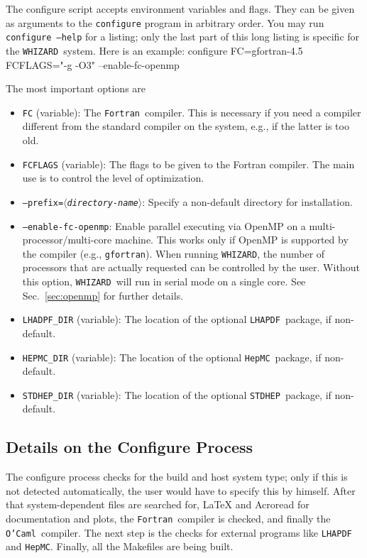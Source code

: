 \documentclass[12pt]{book}
\newenvironment{interaction}%
  {\begingroup\small
   \verbatim}%
  {\endverbatim
   \endgroup\noindent}
\newcommand{\var}[1]{$\langle$\textit{#1}$\rangle$}
\newcommand{\ttt}[1]{\texttt{#1}}
\newcommand{\whizard}{\texttt{WHIZARD}}
\newcommand{\stdhep}{\texttt{STDHEP}}
\newcommand{\lhapdf}{\texttt{LHAPDF}}
\newcommand{\hepmc}{\texttt{HepMC}}
\newcommand{\fortran}{\texttt{Fortran}}
\newcommand{\ocaml}{\texttt{O'Caml}}
\begin{document}
The configure script accepts environment variables and flags.  They
can be given as arguments to the \ttt{configure} program in arbitrary
order.  You may run \ttt{configure --help} for a listing; only the
last part of this long listing is specific for the \whizard\ system.
Here is an example:
\begin{interaction}
  configure  FC=gfortran-4.5  FCFLAGS="-g -O3"  --enable-fc-openmp
\end{interaction}

The most important options are
\begin{itemize}
\item
  \ttt{FC} (variable): The \fortran\ compiler.  This is necessary if
  you need a compiler different from the standard compiler on the
  system, e.g., if the latter is too old.
\item
  \ttt{FCFLAGS} (variable): The flags to be given to the Fortran
  compiler.  The main use is to control the level of optimization.
\item
  \ttt{--prefix=\var{directory-name}}: Specify a non-default directory
  for installation.
\item
  \ttt{--enable-fc-openmp}: Enable parallel executing via OpenMP on a
  multi-processor/multi-core machine.  This works only if OpenMP is
  supported by the compiler (e.g., \ttt{gfortran}).  When running
  \whizard, the number of processors that are actually requested can
  be controlled by the user.  Without this option, \whizard\ will run
  in serial mode on a single core.  See Sec.~\ref{sec:openmp} for
  further details.
\item
  \ttt{LHADPF\_DIR} (variable): The location of the optional \lhapdf\
  package, if non-default.
\item
  \ttt{HEPMC\_DIR} (variable): The location of the optional \hepmc\ package, if
  non-default.
\item
  \ttt{STDHEP\_DIR} (variable): The location of the optional \stdhep\
  package, if non-default.
\end{itemize}


\subsection{Details on the Configure Process}

The configure process checks for the build and host system type; only
if this is not detected automatically, the user would have to specify
this by himself. After that system-dependent files are searched for,
LaTeX and Acroread for documentation and plots, the \fortran\ compiler 
is checked, and finally the \ocaml\ compiler. The next step is the
checks for external programs like \texttt{LHAPDF} and \texttt{HepMC}.
Finally, all the Makefiles are being built. 
\end{document}
